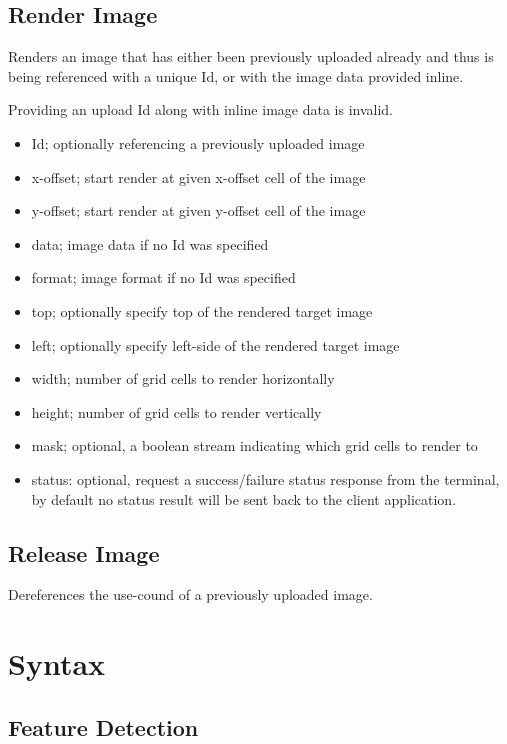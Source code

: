\documentclass{article}
\begin{document}
\subsection{Render Image}

Renders an image that has either been previously uploaded already and thus is being referenced
with a unique Id, or with the image data provided inline.

Providing an upload Id along with inline image data is invalid.

\begin{itemize}
    \item Id; optionally referencing a previously uploaded image
    \item x-offset; start render at given x-offset cell of the image
    \item y-offset; start render at given y-offset cell of the image
    \item data; image data if no Id was specified
    \item format; image format if no Id was specified
    \item top; optionally specify top of the rendered target image
    \item left; optionally specify left-side of the rendered target image
    \item width; number of grid cells to render horizontally
    \item height; number of grid cells to render vertically
    \item mask; optional, a boolean stream indicating which grid cells to render to
    \item status: optional, request a success/failure status response from the terminal, by default
        no status result will be sent back to the client application.
\end{itemize}

\subsection{Release Image}

Dereferences the use-cound of a previously uploaded image.

\section{Syntax}

\subsection{Feature Detection}
\end{document}
